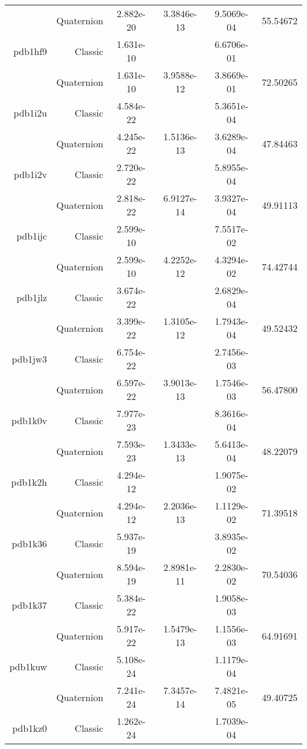 \begin{xltabular}{\textwidth}{r|rS[table-format=1.3e+2]S[table-format=1.4e+2]S[table-format=1.4e+2]S[table-format=-1.5]}
& Quaternion & 2.882e-20 & 3.3846e-13 & 9.5069e-04 & 55.54672\\  \addlinespace
pdb1hf9 & Classic & 1.631e-10 &  & 6.6706e-01 & \\
& Quaternion & 1.631e-10 & 3.9588e-12 & 3.8669e-01 & 72.50265\\  \addlinespace
pdb1i2u & Classic & 4.584e-22 &  & 5.3651e-04 & \\
& Quaternion & 4.245e-22 & 1.5136e-13 & 3.6289e-04 & 47.84463\\  \addlinespace
pdb1i2v & Classic & 2.720e-22 &  & 5.8955e-04 & \\
& Quaternion & 2.818e-22 & 6.9127e-14 & 3.9327e-04 & 49.91113\\  \addlinespace
pdb1ijc & Classic & 2.599e-10 &  & 7.5517e-02 & \\
& Quaternion & 2.599e-10 & 4.2252e-12 & 4.3294e-02 & 74.42744\\  \addlinespace
pdb1jlz & Classic & 3.674e-22 &  & 2.6829e-04 & \\
& Quaternion & 3.399e-22 & 1.3105e-12 & 1.7943e-04 & 49.52432\\  \addlinespace
pdb1jw3 & Classic & 6.754e-22 &  & 2.7456e-03 & \\
& Quaternion & 6.597e-22 & 3.9013e-13 & 1.7546e-03 & 56.47800\\  \addlinespace
pdb1k0v & Classic & 7.977e-23 &  & 8.3616e-04 & \\
& Quaternion & 7.593e-23 & 1.3433e-13 & 5.6413e-04 & 48.22079\\  \addlinespace
pdb1k2h & Classic & 4.294e-12 &  & 1.9075e-02 & \\
& Quaternion & 4.294e-12 & 2.2036e-13 & 1.1129e-02 & 71.39518\\  \addlinespace
pdb1k36 & Classic & 5.937e-19 &  & 3.8935e-02 & \\
& Quaternion & 8.594e-19 & 2.8981e-11 & 2.2830e-02 & 70.54036\\  \addlinespace
pdb1k37 & Classic & 5.384e-22 &  & 1.9058e-03 & \\
& Quaternion & 5.917e-22 & 1.5479e-13 & 1.1556e-03 & 64.91691\\  \addlinespace
pdb1kuw & Classic & 5.108e-24 &  & 1.1179e-04 & \\
& Quaternion & 7.241e-24 & 7.3457e-14 & 7.4821e-05 & 49.40725\\  \addlinespace
pdb1kz0 & Classic & 1.262e-24 &  & 1.7039e-04 & \\

\end{xltabular}
